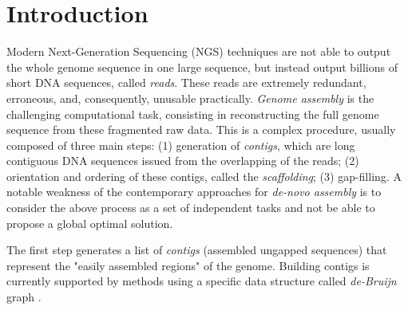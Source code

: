 \section{Introduction}

Modern Next-Generation Sequencing  (NGS) techniques  are not able to output the whole genome sequence in one large sequence, but instead output billions of short DNA sequences, called \textit{reads}.  These reads  are extremely redundant, erroneous, and, consequently, unusable  practically. \textit{Genome assembly} is the challenging computational task, consisting in reconstructing the full genome sequence from these fragmented raw data. This  is a complex procedure, usually composed of three main steps: (1) generation of \textit{contigs}, which are long contiguous DNA sequences issued from the overlapping of the reads; (2) orientation and ordering of these contigs, called the \textit{scaffolding}; (3) gap-filling. A notable weakness of the contemporary approaches for \emph{de-novo assembly} is to consider the above process as a set of independent tasks and not be able to propose a global optimal solution.

The first step generates a list of \textit{contigs} (assembled ungapped sequences) that represent the "easily assembled regions"  of the genome.  Building contigs is currently supported by methods using a specific data structure called  \emph{de-Bruijn} graph \cite{Pevzner14082001}.
%

